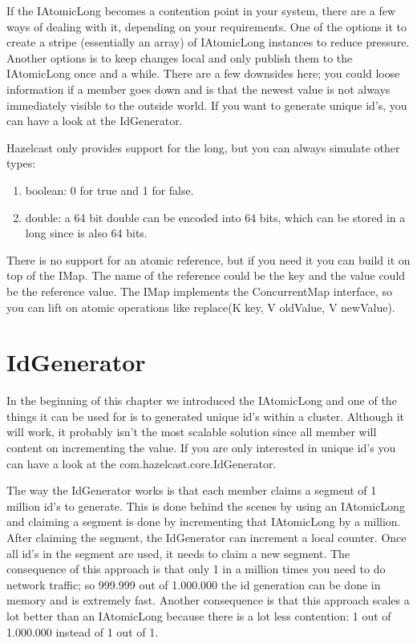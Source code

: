 If the IAtomicLong becomes a contention point in your system, there are a few ways of dealing with it, depending on your requirements. One of the options it to create a stripe (essentially an array) of IAtomicLong instances to reduce pressure. Another options is to keep changes local and only publish them to the IAtomicLong once and a while. There are a few downsides here; you could loose information if a member goes down and is that the newest value is not always immediately visible to the outside world. If you want to generate unique id's, you can have a look at the IdGenerator.

Hazelcast only provides support for the long, but you can always simulate other types:
\begin{enumerate}
\item boolean: 0 for true and 1 for false.
\item double: a 64 bit double can be encoded into 64 bits, which can be stored in a long since is also 64 bits.
\end{enumerate}
There is no support for an atomic reference, but if you need it you can build it on top of the IMap. The name of the reference could be the key and the value could be the reference value. The IMap implements the ConcurrentMap interface, so you can lift on atomic operations like replace(K key, V oldValue, V newValue). 

\section{IdGenerator}
In the beginning of this chapter we introduced the IAtomicLong and one of the things it can be used for is to generated unique id's within a cluster. Although it will work, it probably isn't the most scalable solution since all member will content on incrementing the value. If you are only interested in unique id's you can have a look at the com.hazelcast.core.IdGenerator.

The way the IdGenerator works is that each member claims a segment of 1 million id's to generate. This is done behind the scenes by using an IAtomicLong and claiming a segment is done by incrementing that IAtomicLong by a million. After claiming the segment, the IdGenerator can increment a local counter. Once all id's in the segment are used, it needs to claim a new segment. The consequence of this approach is that only 1 in a million times you need to do network traffic; so 999.999 out of 1.000.000 the id generation can be done in memory and is extremely fast. Another consequence is that this approach scales a lot better than an IAtomicLong because there is a lot less contention: 1 out of 1.000.000 instead of 1 out of 1.


